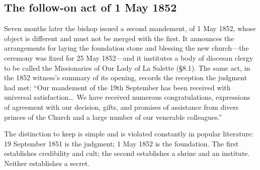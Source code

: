 \subsection{The follow-on act of 1 May 1852}

Seven months later the bishop issued a second mandement, of 1 May
1852, whose object is different and must not be merged with the
first. It announces the arrangements for laying the foundation stone
and blessing the new church---the ceremony was fixed for 25 May
1852---and it institutes a body of diocesan clergy to be called the
Missionaries of Our Lady of La Salette (\S8.1). The same act, in
the 1852 witness's summary of its opening, records the reception the
judgment had met: ``Our mandement of the 19th September has been
received with universal satisfaction\ldots\ We have received
numerous congratulations, expressions of agreement with our
decision, gifts, and promises of assistance from divers princes of
the Church and a large number of our venerable
colleagues.''

The distinction to keep is simple and is violated constantly in
popular literature: 19 September 1851 is the judgment; 1 May 1852 is
the foundation. The first establishes credibility and cult; the
second establishes a shrine and an institute. Neither establishes a
secret.
